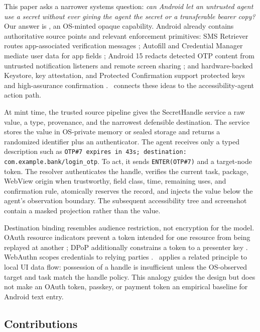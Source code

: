 This paper asks a narrower systems question: \emph{can Android let an untrusted agent use a secret without ever giving the agent the secret or a transferable bearer copy?} Our answer is \SH, an OS-minted opaque capability. Android already contains authoritative source points and relevant enforcement primitives: SMS Retriever routes app-associated verification messages \cite{androidSmsRetriever}; Autofill and Credential Manager mediate user data for app fields \cite{androidAutofill,androidCredentialManager,androidAutofillServices}; Android 15 redacts detected OTP content from untrusted notification listeners and remote screen sharing \cite{android15privacy}; and hardware-backed Keystore, key attestation, and Protected Confirmation support protected keys and high-assurance confirmation \cite{androidKeystore,androidKeyAttestation,androidProtectedConfirmation}. \SH\ connects these ideas to the accessibility-agent action path.

At mint time, the trusted source pipeline gives the SecretHandle service a raw value, a type, provenance, and the narrowest defensible destination. The service stores the value in OS-private memory or sealed storage and returns a randomized identifier plus an authenticator. The agent receives only a typed description such as \texttt{OTP\#7 expires in 43s; destination: com.example.bank/login\_otp}. To act, it sends \texttt{ENTER(OTP\#7)} and a target-node token. The resolver authenticates the handle, verifies the current task, package, WebView origin when trustworthy, field class, time, remaining uses, and confirmation rule, atomically reserves the record, and injects the value below the agent's observation boundary. The subsequent accessibility tree and screenshot contain a masked projection rather than the value.

Destination binding resembles audience restriction, not encryption for the model. OAuth resource indicators prevent a token intended for one resource from being replayed at another \cite{rfc8707}; DPoP additionally constrains a token to a presenter key \cite{rfc9449}. WebAuthn scopes credentials to relying parties \cite{webauthn3}. \SH\ applies a related principle to local UI data flow: possession of a handle is insufficient unless the OS-observed target and task match the handle policy. This analogy guides the design but does not make an OAuth token, passkey, or payment token an empirical baseline for Android text entry.

\subsection{Contributions}

